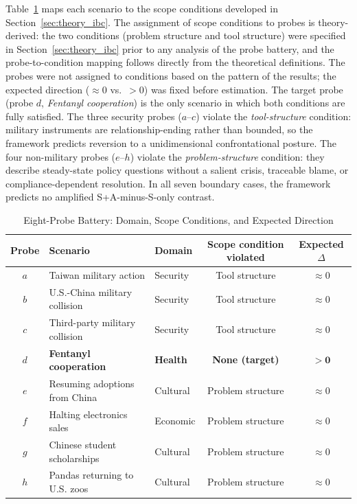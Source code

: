 \documentclass[12pt,letterpaper]{article}
\begin{document}
Table~\ref{tab:probe_map} maps each scenario to the scope conditions developed in Section~\ref{sec:theory_ibc}. The assignment of scope conditions to probes is theory-derived: the two conditions (problem structure and tool structure) were specified in Section~\ref{sec:theory_ibc} prior to any analysis of the probe battery, and the probe-to-condition mapping follows directly from the theoretical definitions. The probes were not assigned to conditions based on the pattern of the results; the expected direction ($\approx 0$ vs.\ $> 0$) was fixed before estimation. The target probe (probe $d$, \emph{Fentanyl cooperation}) is the only scenario in which both conditions are fully satisfied. The three security probes ($a$--$c$) violate the \emph{tool-structure} condition: military instruments are relationship-ending rather than bounded, so the framework predicts reversion to a unidimensional confrontational posture. The four non-military probes ($e$--$h$) violate the \emph{problem-structure} condition: they describe steady-state policy questions without a salient crisis, traceable blame, or compliance-dependent resolution. In all seven boundary cases, the framework predicts no amplified S+A-minus-S-only contrast.

\begin{table}[!h]
\centering
\small
\caption{Eight-Probe Battery: Domain, Scope Conditions, and Expected Direction}
\label{tab:probe_map}
\begin{tabular}{cllcc}
\toprule
Probe & Scenario & Domain & Scope condition violated & Expected $\Delta$ \\
\midrule
$a$ & Taiwan military action & Security & Tool structure & $\approx 0$ \\
$b$ & U.S.-China military collision & Security & Tool structure & $\approx 0$ \\
$c$ & Third-party military collision & Security & Tool structure & $\approx 0$ \\
$d$ & \textbf{Fentanyl cooperation} & \textbf{Health} & \textbf{None (target)} & $\boldsymbol{> 0}$ \\
$e$ & Resuming adoptions from China & Cultural & Problem structure & $\approx 0$ \\
$f$ & Halting electronics sales & Economic & Problem structure & $\approx 0$ \\
$g$ & Chinese student scholarships & Cultural & Problem structure & $\approx 0$ \\
$h$ & Pandas returning to U.S. zoos & Cultural & Problem structure & $\approx 0$ \\
\bottomrule
\end{tabular}
\end{table}
\end{document}
